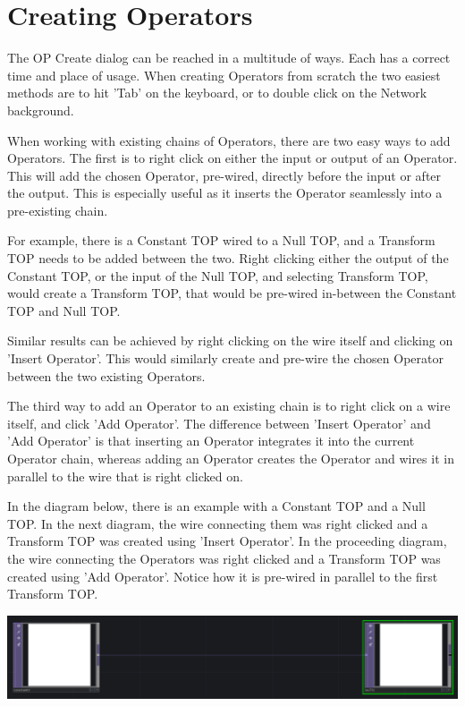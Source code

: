 \section{Creating Operators}
\begin{fullwidth}
The OP Create dialog can be reached in a multitude of ways. Each has a correct time and place of usage. When creating Operators from scratch the two easiest methods are to hit 'Tab' on the keyboard, or to double click on the Network background.

When working with existing chains of Operators, there are two easy ways to add Operators. The first is to right click on either the input or output of an Operator. This will add the chosen Operator, pre-wired, directly before the input or after the output. This is especially useful as it inserts the Operator seamlessly into a pre-existing chain.

For example, there is a Constant TOP wired to a Null TOP, and a Transform TOP needs to be added between the two. Right clicking either the output of the Constant TOP, or the input of the Null TOP, and selecting Transform TOP, would create a Transform TOP, that would be pre-wired in-between the Constant TOP and Null TOP.

Similar results can be achieved by right clicking on the wire itself and clicking on 'Insert Operator'. This would similarly create and pre-wire the chosen Operator between the two existing Operators.

The third way to add an Operator to an existing chain is to right click on a wire itself, and click  'Add Operator'. The difference between 'Insert Operator' and 'Add Operator'  is that inserting an Operator integrates it into the current Operator chain, whereas adding an Operator creates the Operator and wires it in parallel to the wire that is right clicked on. 

In the diagram below, there is an example with a Constant TOP and a Null TOP. In the next diagram, the wire connecting them was right clicked and a Transform TOP was created using 'Insert Operator'. In the proceeding diagram, the wire connecting the Operators was right clicked and a Transform TOP was created using 'Add Operator'. Notice how it is pre-wired in parallel to the first Transform TOP.


\begin{center} 
\includegraphics{./img/1.2/creating-operators-1.png}


\end{center}
\end{fullwidth}
